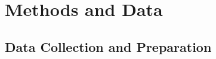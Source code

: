 \documentclass[journal=jacsat,manuscript=article, ]{achemso}
\begin{document}

\section{Methods and Data}

\subsection{Data Collection and Preparation}
\end{document}
